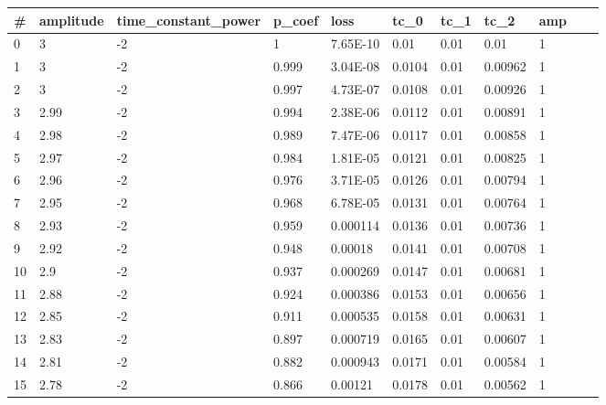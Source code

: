 	\begin{table}[ht]
		\begin{tabular}{|l|l|l|l|l|l|l|l|l|l|l|}
            \hline
			\# & amplitude & time\_constant\_power & p\_coef & loss     & tc\_0  & tc\_1 & tc\_2   & amp\\ \hline
			0  & 3         & -2                    & 1       & 7.65E-10 & 0.01   & 0.01  & 0.01    & 1  \\ \hline
			1  & 3         & -2                    & 0.999   & 3.04E-08 & 0.0104 & 0.01  & 0.00962 & 1  \\ \hline
			2  & 3         & -2                    & 0.997   & 4.73E-07 & 0.0108 & 0.01  & 0.00926 & 1  \\ \hline
			3  & 2.99      & -2                    & 0.994   & 2.38E-06 & 0.0112 & 0.01  & 0.00891 & 1  \\ \hline
			4  & 2.98      & -2                    & 0.989   & 7.47E-06 & 0.0117 & 0.01  & 0.00858 & 1  \\ \hline
			5  & 2.97      & -2                    & 0.984   & 1.81E-05 & 0.0121 & 0.01  & 0.00825 & 1  \\ \hline
			6  & 2.96      & -2                    & 0.976   & 3.71E-05 & 0.0126 & 0.01  & 0.00794 & 1  \\ \hline
			7  & 2.95      & -2                    & 0.968   & 6.78E-05 & 0.0131 & 0.01  & 0.00764 & 1  \\ \hline
			8  & 2.93      & -2                    & 0.959   & 0.000114 & 0.0136 & 0.01  & 0.00736 & 1  \\ \hline
			9  & 2.92      & -2                    & 0.948   & 0.00018  & 0.0141 & 0.01  & 0.00708 & 1  \\ \hline
			10 & 2.9       & -2                    & 0.937   & 0.000269 & 0.0147 & 0.01  & 0.00681 & 1  \\ \hline
			11 & 2.88      & -2                    & 0.924   & 0.000386 & 0.0153 & 0.01  & 0.00656 & 1  \\ \hline
			12 & 2.85      & -2                    & 0.911   & 0.000535 & 0.0158 & 0.01  & 0.00631 & 1  \\ \hline
			13 & 2.83      & -2                    & 0.897   & 0.000719 & 0.0165 & 0.01  & 0.00607 & 1  \\ \hline
			14 & 2.81      & -2                    & 0.882   & 0.000943 & 0.0171 & 0.01  & 0.00584 & 1  \\ \hline
			15 & 2.78      & -2                    & 0.866   & 0.00121  & 0.0178 & 0.01  & 0.00562 & 1  \\ \hline

\end{tabular}
\end{table}
